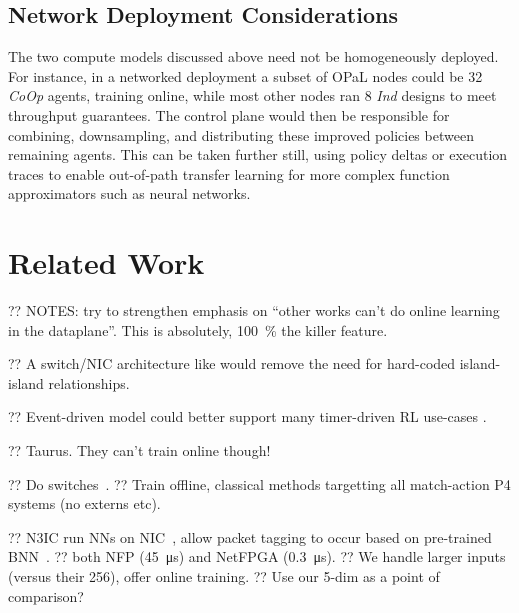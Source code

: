 \documentclass[sigconf,natbib=false]{acmart}
\newcommand{\approachshort}{OPaL}
\newcommand{\Coopfw}{\emph{CoOp}}
\newcommand{\coopfw}{\Coopfw}
\newcommand{\Indfw}{\emph{Ind}}
\newcommand{\indfw}{\Indfw}
\begin{document}

\subsection{Network Deployment Considerations}
The two compute models discussed above need not be homogeneously deployed.
For instance, in a networked deployment a subset of \approachshort{} nodes could be \SI{32}{\bit} \coopfw{} agents, training online, while most other nodes ran \SI{8}{\bit} \indfw{} designs to meet throughput guarantees.
The control plane would then be responsible for combining, downsampling, and distributing these improved policies between remaining agents.
This can be taken further still, using policy deltas or execution traces to enable out-of-path transfer learning for more complex function approximators such as neural networks.

\section{Related Work}

?? NOTES: try to strengthen emphasis on ``other works can't do online learning in the dataplane''. This is absolutely, \SI{100}{\percent} the killer feature.

?? A switch/NIC architecture like \textcite{DBLP:conf/hotnets/StephensAS18} would remove the need for hard-coded island-island relationships.

?? Event-driven model could better support many timer-driven RL use-cases \textcite{DBLP:conf/hotnets/IbanezABM19}.

?? Taurus. They can't train online though!~\parencite{DBLP:journals/corr/abs-2002-08987}

?? Do switches~\parencite{DBLP:conf/hotnets/XiongZ19}.
?? Train offline, classical methods targetting all match-action P4 systems (no externs etc).

\parencite{DBLP:journals/corr/abs-2002-08987,DBLP:journals/corr/abs-2009-02353,DBLP:conf/sigcomm/SanvitoSB18,DBLP:journals/corr/abs-1801-05731,langlet-ml-netronome}

?? N3IC run NNs on NIC~\parencite{DBLP:journals/corr/abs-2009-02353}, allow packet tagging to occur based on pre-trained BNN~\parencite{DBLP:conf/nips/HubaraCSEB16}.
?? both NFP (\SI{45}{\micro\second}) and NetFPGA (\SI{0.3}{\micro\second}).
?? We handle larger inputs (versus their \SI{256}{\bit}), offer online training.
?? Use our 5-dim as a point of comparison?
\end{document}
